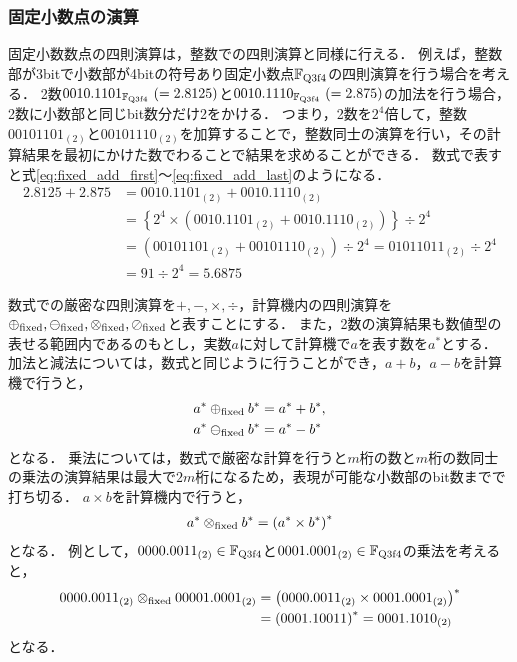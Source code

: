 \subsubsection{固定小数点の演算}
固定小数数点の四則演算は，整数での四則演算と同様に行える．
例えば，整数部が3bitで小数部が4bitの符号あり固定小数点$\mathbb{F}_{\text{Q}{3}\text{f}{4}}$の四則演算を行う場合を考える．
2数$0010.1101_{\mathbb{F}_{\text{Q}{3}\text{f}{4}}} \ (= 2.8125)$と$0010.1110_{\mathbb{F}_{\text{Q}{3}\text{f}{4}}} \ (= 2.875)$の加法を行う場合，2数に小数部と同じbit数分だけ2をかける．
つまり，2数を$2^4$倍して，整数$00101101_{(2)}$と$00101110_{(2)}$を加算することで，整数同士の演算を行い，その計算結果を最初にかけた数でわることで結果を求めることができる．
数式で表すと式\eqref{eq:fixed_add_first}〜\eqref{eq:fixed_add_last}のようになる．
\begin{align}
    2.8125 + 2.875 &=
    0010.1101_{(2)} + 0010.1110_{(2)} \label{eq:fixed_add_first} \\
    &= \left\{ 2^4 \times \left(0010.1101_{(2)} + 0010.1110_{(2)}\right) \right\} \div 2^4 \\
    &= \left(00101101_{(2)} + 00101110_{(2)} \right) \div 2^4= 01011011_{(2)} \div 2^4\\
    &= 91 \div 2^4 = 5.6875 \label{eq:fixed_add_last}
\end{align}

数式での厳密な四則演算を$+,-,\times,\div$，計算機内の四則演算を$\oplus_{\mathrm{fixed}},\ominus_{\mathrm{fixed}} ,\otimes_{\mathrm{fixed}},\\ \oslash_{\mathrm{fixed}}$と表すことにする．
また，2数の演算結果も数値型の表せる範囲内であるのもとし，実数$a$に対して計算機で$a$を表す数を$a^{\ast}$とする．
加法と減法については，数式と同じように行うことができ，$a+b$，$a-b$を計算機で行うと，
\begin{align*}
    a^{\ast} \oplus_{\mathrm{fixed}} b^{\ast} &= a^{\ast} + b^{\ast}, \\ 
    a^{\ast} \ominus_{\mathrm{fixed}} b^{\ast} &= a^{\ast} - b^{\ast}
\end{align*}
となる．
乗法については，数式で厳密な計算を行うと$m$桁の数と$m$桁の数同士の乗法の演算結果は最大で$2m$桁になるため，表現が可能な小数部のbit数までで打ち切る．
$a \times b$を計算機内で行うと，
\begin{align*}  
    a^{\ast} \otimes_{\mathrm{fixed}} b^{\ast} = \left(a^{\ast} \times b^{\ast}\right)^{\ast}
\end{align*}
となる．
例として，$0000.0011_{(2)} \in \mathbb{F}_{\text{Q}{3}\text{f}{4}}$と$0001.0001_{(2)} \in \mathbb{F}_{\text{Q}{3}\text{f}{4}}$の乗法を考えると，
\begin{align*}
    0000.0011_{(2)} \otimes_{\mathrm{fixed}} 00001.0001_{(2)} &= \left(0000.0011_{(2)} \times 0001.0001_{(2)}\right)^{\ast} \\
    &= \left(0001.10011\right)^{\ast} = 0001.1010_{(2)}
\end{align*}
となる．


